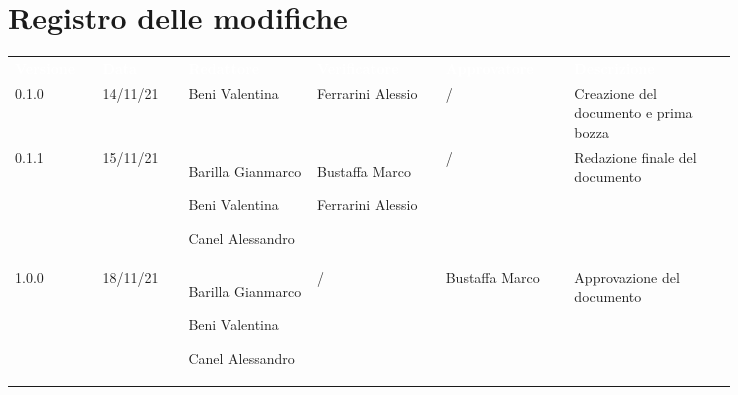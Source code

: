 \section*{Registro delle modifiche}

{\renewcommand{\arraystretch}{1.5}
\scriptsize
\begin{tabular}{p{0.10\linewidth}p{0.10\linewidth}p{0.15\linewidth}p{0.15\linewidth}p{0.15\linewidth}p{0.19\linewidth}}
	\rowcolor[RGB]{33, 73, 50}
	\textcolor{white}{\textbf{Versione}} & \textcolor{white}{\textbf{Data}} & \textcolor{white}
	{\textbf{Redattore}} & \textcolor{white}{\textbf{Verificatore}} & \textcolor{white}{\textbf{Approvatore}} & \textcolor{white}
	{\textbf{Descrizione}}\\
	\rowcolor[RGB]{216, 235, 171}
	0.1.0 & 14/11/21 & Beni Valentina & Ferrarini Alessio & / & Creazione del documento e prima bozza\\
	\rowcolor[RGB]{233, 245, 206}
	0.1.1 & 15/11/21 & Barilla Gianmarco \par  Beni Valentina  \par Canel Alessandro & Bustaffa Marco \par Ferrarini Alessio & / & Redazione finale del documento\\
	\rowcolor[RGB]{216, 235, 171}
	1.0.0 & 18/11/21 & Barilla Gianmarco \par Beni Valentina \par Canel Alessandro & / & Bustaffa Marco & Approvazione del documento
\end{tabular}	
}
